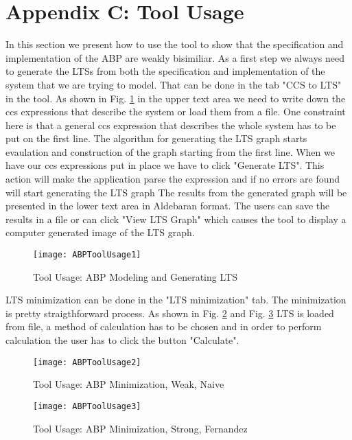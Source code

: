 \section*{Appendix C: Tool Usage}

In this section we present how to use the tool to show that the specification and 
implementation of the ABP are weakly bisimiliar. As a first step we always need to
generate the LTSs from both the specification and implementation of the system that
we are trying to model. That can be done in the tab "CCS to LTS" in the tool. As shown
in Fig. \ref{fig:abptoolusage1} in the upper text area we need to write down the ccs 
expressions that describe the system or load them from a file. One constraint here
is that a general ccs expression that describes the whole system has to be put on
the first line. The algorithm for generating the LTS graph starts evaulation and 
construction of the graph starting from the first line. When we have our ccs expressions
put in place we have to click "Generate LTS". This action will make the application
parse the expression and if no errors are found will start generating the LTS graph
The results from the generated graph will be presented in the lower text area in 
Aldebaran format. The users can save the results in a file or can click "View LTS Graph" 
which causes the tool to display a computer generated image of the LTS graph.

\begin{figure}
\centering
\texttt{[image: ABPToolUsage1]}
\caption{Tool Usage: ABP Modeling and Generating LTS}
\label{fig:abptoolusage1}
\end{figure}

LTS minimization can be done in the "LTS minimization" tab. The minimization is pretty 
straigthforward process. As shown in Fig. \ref{fig:abptoolusage2} and Fig. \ref{fig:abptoolusage3}
LTS is loaded from file, a method of calculation has to be chosen and in order to perform
calculation the user has to click the button "Calculate".

\begin{figure}
\centering
\texttt{[image: ABPToolUsage2]}
\caption{Tool Usage: ABP Minimization, Weak, Naive}
\label{fig:abptoolusage2}
\end{figure}

\begin{figure}
\centering
\texttt{[image: ABPToolUsage3]}
\caption{Tool Usage: ABP Minimization, Strong, Fernandez}
\label{fig:abptoolusage3}
\end{figure}

